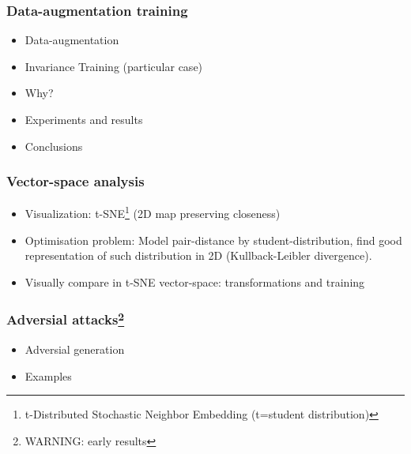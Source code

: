 \documentclass[10pt]{beamer}
\begin{document}
\begin{frame}
    \frametitle{Data-augmentation training}
    \begin{itemize}
        \item Data-augmentation
        \item Invariance Training (particular case)
        \item Why?
        \item Experiments and results
        \item Conclusions
    \end{itemize}
\end{frame}

\begin{frame}
    \frametitle{Vector-space analysis}
    \begin{itemize}
        \item Visualization: t-SNE\footnote{t-Distributed Stochastic Neighbor Embedding (t=student distribution)} (2D map preserving closeness)
        \item Optimisation problem: Model pair-distance by student-distribution, find good representation of such distribution in 2D (Kullback-Leibler divergence).
        \item Visually compare in t-SNE vector-space: transformations and training
    \end{itemize}
\end{frame}

\begin{frame}
    \frametitle{Adversial attacks\footnote{WARNING: early results}}
    \begin{itemize}
        \item Adversial generation
        \item Examples
    \end{itemize}
\end{frame}
\end{document}
